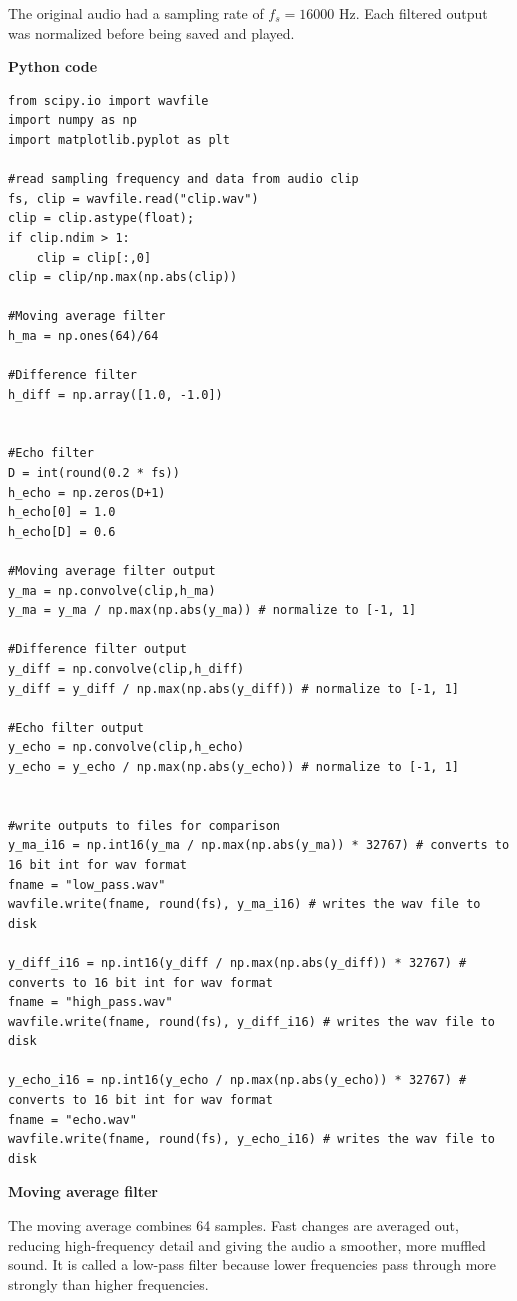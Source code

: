\documentclass[11pt]{article}
\newcommand{\topic}[1]{\Needspace{4\baselineskip}\par\textbf{#1}\par\nopagebreak}
\begin{document}
The original audio had a sampling rate of $f_s=16000$ Hz. Each filtered output was normalized before being saved and played.

\topic{Python code}

\begin{lstlisting}[style=python]
from scipy.io import wavfile
import numpy as np
import matplotlib.pyplot as plt

#read sampling frequency and data from audio clip
fs, clip = wavfile.read("clip.wav")
clip = clip.astype(float); 
if clip.ndim > 1: 
    clip = clip[:,0]
clip = clip/np.max(np.abs(clip))

#Moving average filter
h_ma = np.ones(64)/64

#Difference filter
h_diff = np.array([1.0, -1.0])


#Echo filter
D = int(round(0.2 * fs))
h_echo = np.zeros(D+1)
h_echo[0] = 1.0
h_echo[D] = 0.6

#Moving average filter output
y_ma = np.convolve(clip,h_ma)
y_ma = y_ma / np.max(np.abs(y_ma)) # normalize to [-1, 1]

#Difference filter output
y_diff = np.convolve(clip,h_diff)
y_diff = y_diff / np.max(np.abs(y_diff)) # normalize to [-1, 1]

#Echo filter output
y_echo = np.convolve(clip,h_echo)
y_echo = y_echo / np.max(np.abs(y_echo)) # normalize to [-1, 1]


#write outputs to files for comparison
y_ma_i16 = np.int16(y_ma / np.max(np.abs(y_ma)) * 32767) # converts to 16 bit int for wav format
fname = "low_pass.wav"
wavfile.write(fname, round(fs), y_ma_i16) # writes the wav file to disk

y_diff_i16 = np.int16(y_diff / np.max(np.abs(y_diff)) * 32767) # converts to 16 bit int for wav format
fname = "high_pass.wav"
wavfile.write(fname, round(fs), y_diff_i16) # writes the wav file to disk

y_echo_i16 = np.int16(y_echo / np.max(np.abs(y_echo)) * 32767) # converts to 16 bit int for wav format
fname = "echo.wav"
wavfile.write(fname, round(fs), y_echo_i16) # writes the wav file to disk

\end{lstlisting}

\topic{Moving average filter}

The moving average combines 64 samples. Fast changes are averaged out, reducing high-frequency detail and giving the audio a smoother, more muffled sound. It is called a low-pass filter because lower frequencies pass through more strongly than higher frequencies. 
\end{document}

